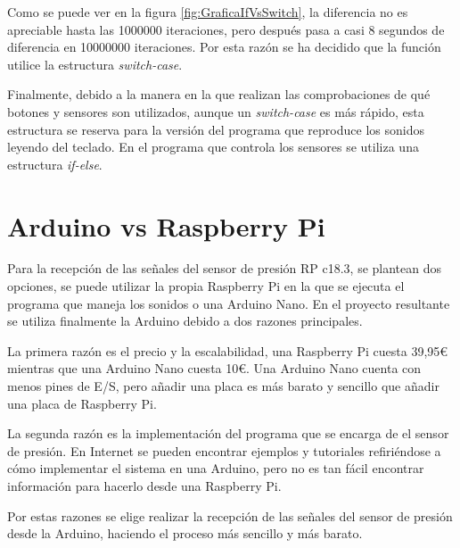             Como se puede ver en la figura \ref{fig:GraficaIfVsSwitch}, la diferencia no es apreciable hasta las
            1000000 iteraciones, pero después pasa a casi 8 segundos de diferencia en 10000000 iteraciones. Por
            esta razón se ha decidido que la función utilice la estructura \textit{switch-case}.\newline

            Finalmente, debido a la manera en la que realizan las comprobaciones de qué botones y sensores son
            utilizados, aunque un \textit{switch-case} es más rápido, esta estructura se reserva para la versión del
            programa que reproduce los sonidos leyendo del teclado. En el programa que controla los sensores se
            utiliza una estructura \textit{if-else}.



    \section{Arduino vs Raspberry Pi} %
    \label{sec:ArduinoVsRaspberryPi}

        Para la recepción de las señales del sensor de presión RP c18.3, se plantean dos opciones, se puede utilizar
        la propia Raspberry Pi en la que se ejecuta el programa que maneja los sonidos o una Arduino Nano. En el
        proyecto resultante se utiliza finalmente la Arduino debido a dos razones principales.\newline

        La primera razón es el precio y la escalabilidad, una Raspberry Pi cuesta 39,95\euro{} mientras que una
        Arduino Nano cuesta 10\euro{}. Una Arduino Nano cuenta con menos pines de E/S, pero añadir una placa es más
        barato y sencillo que añadir una placa de Raspberry Pi.\newline

        La segunda razón es la implementación del programa que se encarga de el sensor de presión. En Internet se
        pueden encontrar ejemplos y tutoriales refiriéndose a cómo implementar el sistema en una Arduino, pero no
        es tan fácil encontrar información para hacerlo desde una Raspberry Pi.\newline

        Por estas razones se elige realizar la recepción de las señales del sensor de presión desde la Arduino,
        haciendo el proceso más sencillo y más barato.

